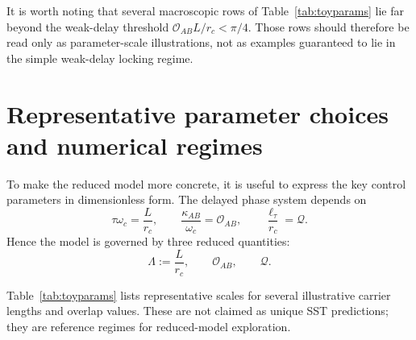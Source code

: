 \documentclass[11pt]{article}
\newcommand{\rc}{r_c}
\begin{document}
        It is worth noting that several macroscopic rows of Table~\ref{tab:toyparams} lie far beyond the weak-delay threshold \(\mathcal{O}_{AB}L/\rc<\pi/4\). Those rows should therefore be read only as parameter-scale illustrations, not as examples guaranteed to lie in the simple weak-delay locking regime.

    \section{Representative parameter choices and numerical regimes}

        To make the reduced model more concrete, it is useful to express the key control parameters in dimensionless form. The delayed phase system depends on
        \[
            \tau\omega_c=\frac{L}{\rc},
            \qquad
            \frac{\kappa_{AB}}{\omega_c}=\mathcal{O}_{AB},
            \qquad
            \frac{\ell_\tau}{\rc}=\mathcal{Q}.
        \]
        Hence the model is governed by three reduced quantities:
        \begin{equation}
            \Lambda:=\frac{L}{\rc},\qquad
            \mathcal{O}_{AB},\qquad
            \mathcal{Q}.
        \end{equation}

        Table~\ref{tab:toyparams} lists representative scales for several illustrative carrier lengths and overlap values. These are not claimed as unique SST predictions; they are reference regimes for reduced-model exploration.
\end{document}
